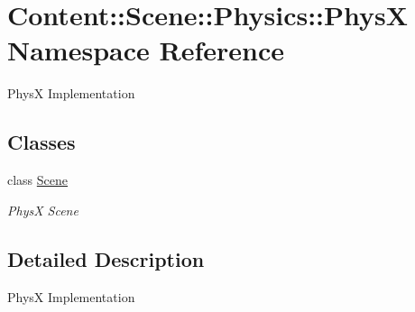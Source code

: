 \hypertarget{namespaceContent_1_1Scene_1_1Physics_1_1PhysX}{
\section{Content::Scene::Physics::PhysX Namespace Reference}
\label{namespaceContent_1_1Scene_1_1Physics_1_1PhysX}
}


PhysX Implementation  
\subsection*{Classes}
\begin{DoxyCompactItemize}
\item 
class \hyperlink{classContent_1_1Scene_1_1Physics_1_1PhysX_1_1Scene}{Scene}
\begin{DoxyCompactList}\small\item\em PhysX Scene \item\end{DoxyCompactList}\end{DoxyCompactItemize}


\subsection{Detailed Description}
PhysX Implementation 